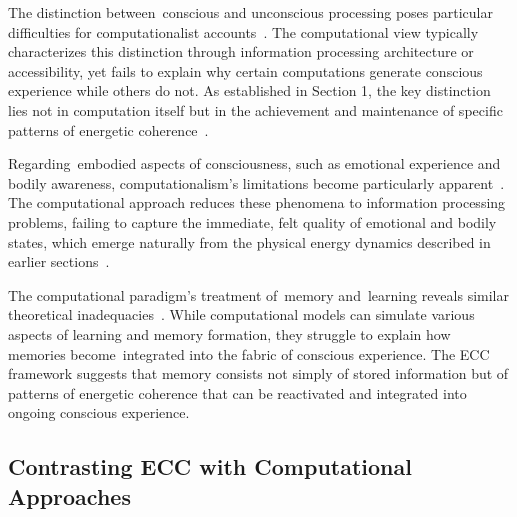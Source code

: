 The distinction between~conscious and unconscious processing poses particular difficulties for computationalist accounts~\cite{dehaene2011experimental,seth2021being}. The computational view typically characterizes this distinction through information processing architecture or accessibility, yet fails to explain why certain computations generate conscious experience while others do not. As established in Section 1, the key distinction lies not in computation itself but in the achievement and maintenance of specific patterns of energetic coherence~\cite{varela1996neurophenomenology,gallagher2020phenomenological}.

Regarding~embodied aspects of consciousness, such as emotional experience and bodily awareness, computationalism's limitations become particularly apparent~\cite{mossio2015biological,difrisco2014hylomorphism}. The computational approach reduces these phenomena to information processing problems, failing to capture the immediate, felt quality of emotional and bodily states, which emerge naturally from the physical energy dynamics described in earlier sections~\cite{levin2019computational,gershman2023molecular}.

The computational paradigm's treatment of~memory and~learning reveals similar theoretical inadequacies~\cite{da2024mathematical,zheng2025unbearable}. While computational models can simulate various aspects of learning and memory formation, they struggle to explain how memories become~integrated into the fabric of conscious experience. The ECC framework suggests that memory consists not simply of stored information but of patterns of energetic coherence that can be reactivated and integrated into ongoing conscious experience.

\subsection*{Contrasting ECC with Computational Approaches}

